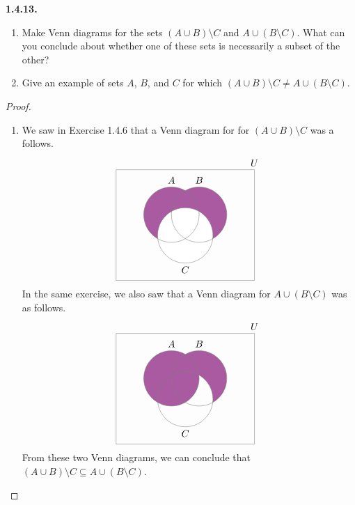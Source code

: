 \documentclass[12pt]{amsart}
\newenvironment{statement}[1]{\smallskip\noindent\color[rgb]{.6627, .3529, .6314} {\bf #1.}}{}
\theoremstyle{definition}
\theoremstyle{remark}
\begin{document}
\begin{statement}{1.4.13}
\begin{enumerate}
	\item Make Venn diagrams for the sets $(A \cup B) \setminus C$ and $A \cup (B \setminus C)$.
	What can you conclude about whether one of these sets is necessarily a subset of the other?
	
	\item Give an example of sets $A$, $B$, and $C$ for which $(A \cup B) \setminus C \neq A \cup (B \setminus C)$.
\end{enumerate}
\end{statement}

\begin{proof}
\hfill
\begin{enumerate}
	\item We saw in Exercise 1.4.6 that a Venn diagram for for $(A \cup B) \setminus C$ was a follows.
	\begin{equation*}
		\begin{tikzpicture}
			\begin{scope}
				\fill[color = zesty purple] (0, 0.375) circle (1);
				\fill[color = zesty purple] (1, 0.375) circle (1);
			\end{scope}
			\begin{scope}
				\fill[color = white] (0.5, -0.375) circle (1);
			\end{scope}
			\draw[gray] 
				(0, 0.375) circle (1) 
				(0, 1.375)  node [text=black, above] {$A$}
				(1, 0.375) circle (1) 
				(1, 1.375)  node [text=black, above] {$B$}
				(0.5, -0.375) circle (1)
				(0.5, -1.375) node [text=black, below] {$C$}
				(-2, -2) rectangle 
				(3, 2) node [text=black, above] {$U$};
		\end{tikzpicture}
	\end{equation*}
	In the same exercise, we also saw that a Venn diagram for $A \cup (B \setminus C)$ was as follows.
	\begin{equation*}	
		\begin{tikzpicture}[fill = zesty purple]
			\begin{scope}
				\fill (0, 0.375) circle (1);
			\end{scope}
			\begin{scope}
				\clip (-2, -2) rectangle (2, 2) 
					(0.5, -0.375) circle (1);
				\fill (1, 0.375) circle (1);
			\end{scope}
			\draw[gray] 
				(0, 0.375) circle (1) 
				(0, 1.375)  node [text=black, above] {$A$}
				(1, 0.375) circle (1) 
				(1, 1.375)  node [text=black, above] {$B$}
				(0.5, -0.375) circle (1)
				(0.5, -1.375) node [text=black, below] {$C$}
				(-2, -2) rectangle 
				(3, 2) node [text=black, above] {$U$};
		\end{tikzpicture}
	\end{equation*}
	From these two Venn diagrams, we can conclude that $(A \cup B) \setminus C \subseteq A \cup (B \setminus C)$.
	

\end{enumerate}
\end{proof}
\end{document}
